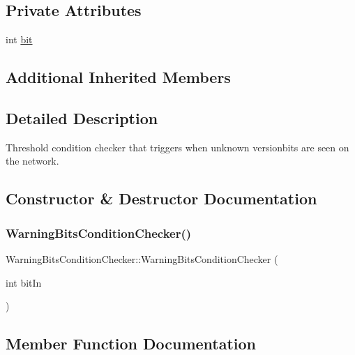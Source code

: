 \subsection*{Private Attributes}
\begin{DoxyCompactItemize}
\item 
int \mbox{\hyperlink{class_warning_bits_condition_checker_aa5aa794fd8c944ed9926ba2c818976b8}{bit}}
\end{DoxyCompactItemize}
\subsection*{Additional Inherited Members}


\subsection{Detailed Description}
Threshold condition checker that triggers when unknown versionbits are seen on the network. 

\subsection{Constructor \& Destructor Documentation}
\mbox{\label{class_warning_bits_condition_checker_a69026dee13dfeedbaeff0f3a6997fc10}} 
\subsubsection{\texorpdfstring{Warning\+Bits\+Condition\+Checker()}{WarningBitsConditionChecker()}}
{\footnotesize\ttfamily Warning\+Bits\+Condition\+Checker\+::\+Warning\+Bits\+Condition\+Checker (\begin{DoxyParamCaption}\item[{int}]{bit\+In }\end{DoxyParamCaption})\hspace{0.3cm}{\ttfamily [inline]}}



\subsection{Member Function Documentation}
\mbox{\label{class_warning_bits_condition_checker_ab0aff380fa3d04ad540ce178792dad53}} 
